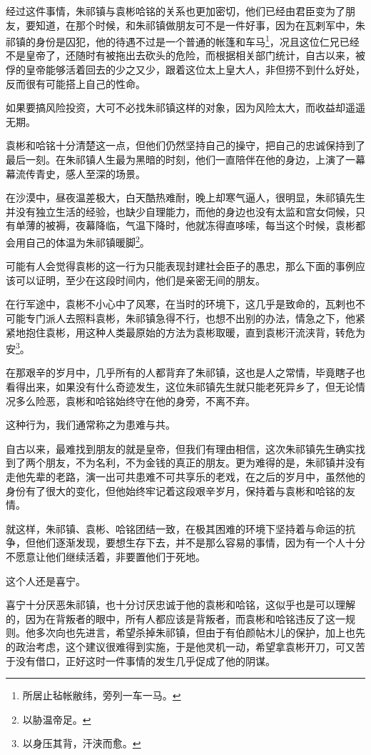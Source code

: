 \begin{multicols}{\theparacolNo}
经过这件事情，朱祁镇与袁彬哈铭的关系也更加密切，他们已经由君臣变为了朋友，要知道，在那个时候，和朱祁镇做朋友可不是一件好事，因为在瓦剌军中，朱祁镇的身份是囚犯，他的待遇不过是一个普通的帐篷和车马\footnote{所居止毡帐敝纬，旁列一车一马。}，况且这位仁兄已经不是皇帝了，还随时有被拖出去砍头的危险，而根据相关部门统计，自古以来，被俘的皇帝能够活着回去的少之又少，跟着这位太上皇大人，非但捞不到什么好处，反而很有可能搭上自己的性命。

如果要搞风险投资，大可不必找朱祁镇这样的对象，因为风险太大，而收益却遥遥无期。

袁彬和哈铭十分清楚这一点，但他们仍然坚持自己的操守，把自己的忠诚保持到了最后一刻。在朱祁镇人生最为黑暗的时刻，他们一直陪伴在他的身边，上演了一幕幕流传青史，感人至深的场景。

在沙漠中，昼夜温差极大，白天酷热难耐，晚上却寒气逼人，很明显，朱祁镇先生并没有独立生活的经验，也缺少自理能力，而他的身边也没有太监和宫女伺候，只有单薄的被褥，夜幕降临，气温下降时，他就冻得直哆嗦，每当这个时候，袁彬都会用自己的体温为朱祁镇暖脚\footnote{以胁温帝足。}。

可能有人会觉得袁彬的这一行为只能表现封建社会臣子的愚忠，那么下面的事例应该可以证明，至少在这段时间内，他们是亲密无间的朋友。

在行军途中，袁彬不小心中了风寒，在当时的环境下，这几乎是致命的，瓦剌也不可能专门派人去照料袁彬，朱祁镇急得不行，也想不出别的办法，情急之下，他紧紧地抱住袁彬，用这种人类最原始的方法为袁彬取暖，直到袁彬汗流浃背，转危为安\footnote{以身压其背，汗浃而愈。}。

在那艰辛的岁月中，几乎所有的人都背弃了朱祁镇，这也是人之常情，毕竟瞎子也看得出来，如果没有什么奇迹发生，这位朱祁镇先生就只能老死异乡了，但无论情况多么险恶，袁彬和哈铭始终守在他的身旁，不离不弃。

这种行为，我们通常称之为患难与共。

自古以来，最难找到朋友的就是皇帝，但我们有理由相信，这次朱祁镇先生确实找到了两个朋友，不为名利，不为金钱的真正的朋友。更为难得的是，朱祁镇并没有走他先辈的老路，演一出可共患难不可共享乐的老戏，在之后的岁月中，虽然他的身份有了很大的变化，但他始终牢记着这段艰辛岁月，保持着与袁彬和哈铭的友情。

就这样，朱祁镇、袁彬、哈铭团结一致，在极其困难的环境下坚持着与命运的抗争，但他们逐渐发现，要想生存下去，并不是那么容易的事情，因为有一个人十分不愿意让他们继续活着，非要置他们于死地。

这个人还是喜宁。

喜宁十分厌恶朱祁镇，也十分讨厌忠诚于他的袁彬和哈铭，这似乎也是可以理解的，因为在背叛者的眼中，所有人都应该是背叛者，而袁彬和哈铭违反了这一规则。他多次向也先进言，希望杀掉朱祁镇，但由于有伯颜帖木儿的保护，加上也先的政治考虑，这个建议很难得到实施，于是他灵机一动，希望拿袁彬开刀，可又苦于没有借口，正好这时一件事情的发生几乎促成了他的阴谋。


\end{multicols}

